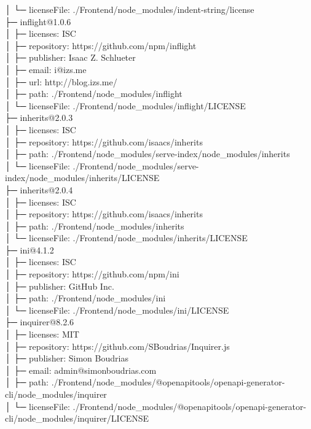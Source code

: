 │  └─ licenseFile: ./Frontend/node\_modules/indent-string/license\\
├─ inflight@1.0.6\\
│  ├─ licenses: ISC\\
│  ├─ repository: https://github.com/npm/inflight\\
│  ├─ publisher: Isaac Z. Schlueter\\
│  ├─ email: i@izs.me\\
│  ├─ url: http://blog.izs.me/\\
│  ├─ path: ./Frontend/node\_modules/inflight\\
│  └─ licenseFile: ./Frontend/node\_modules/inflight/LICENSE\\
├─ inherits@2.0.3\\
│  ├─ licenses: ISC\\
│  ├─ repository: https://github.com/isaacs/inherits\\
│  ├─ path: ./Frontend/node\_modules/serve-index/node\_modules/inherits\\
│  └─ licenseFile: ./Frontend/node\_modules/serve-index/node\_modules/inherits/LICENSE\\
├─ inherits@2.0.4\\
│  ├─ licenses: ISC\\
│  ├─ repository: https://github.com/isaacs/inherits\\
│  ├─ path: ./Frontend/node\_modules/inherits\\
│  └─ licenseFile: ./Frontend/node\_modules/inherits/LICENSE\\
├─ ini@4.1.2\\
│  ├─ licenses: ISC\\
│  ├─ repository: https://github.com/npm/ini\\
│  ├─ publisher: GitHub Inc.\\
│  ├─ path: ./Frontend/node\_modules/ini\\
│  └─ licenseFile: ./Frontend/node\_modules/ini/LICENSE\\
├─ inquirer@8.2.6\\
│  ├─ licenses: MIT\\
│  ├─ repository: https://github.com/SBoudrias/Inquirer.js\\
│  ├─ publisher: Simon Boudrias\\
│  ├─ email: admin@simonboudrias.com\\
│  ├─ path: ./Frontend/node\_modules/@openapitools/openapi-generator-cli/node\_modules/inquirer\\
│  └─ licenseFile: ./Frontend/node\_modules/@openapitools/openapi-generator-cli/node\_modules/inquirer/LICENSE\\

